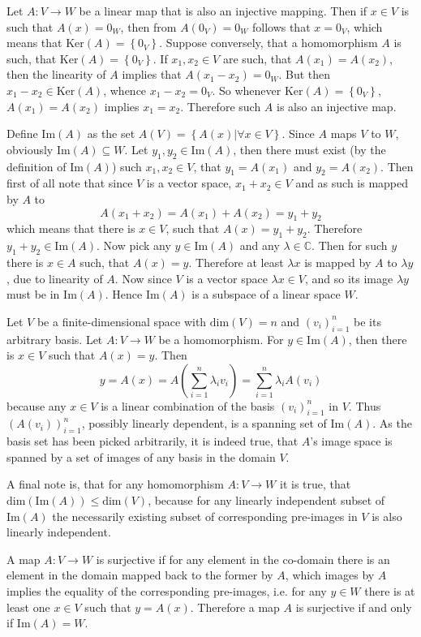 \documentclass[a4paper]{article}
\newcommand{\obj}[1]{\ensuremath{\left\{ #1 \right\}}}
\newcommand{\brac}[1]{\ensuremath{\left( #1 \right)}}
\newcommand{\Dim}[1]{\ensuremath{\text{dim}\brac{ #1 }}}
\newcommand{\Ker}[1]{\ensuremath{\text{Ker}\brac{ #1 }}}
\newcommand{\im}[1]{\ensuremath{\text{Im}\brac{ #1 }}}
\begin{document}
Let $A:V\to W$ be a linear map that is also an injective mapping. Then if $x\in V$ is such that $A\brac{x}=0_W$, then from $A\brac{0_V} = 0_W$ follows that $x = 0_V$, which means that $\Ker{A} = \obj{0_V}$. Suppose conversely, that a homomorphism $A$ is such, that $\Ker{A} = \obj{0_V}$. If $x_1, x_2\in V$ are such, that $A\brac{x_1} = A\brac{x_2}$, then the linearity of $A$ implies that $A\brac{x_1-x_2}=0_W$. But then $x_1-x_2 \in \Ker{A}$, whence $x_1-x_2=0_V$. So whenever $\Ker{A}=\obj{0_V}$, $A\brac{x_1} = A\brac{x_2}$ implies $x_1 = x_2$. Therefore such $A$ is also an injective map.

Define $\im{A}$ as the set $A\brac{V} = \obj{A\brac{x}\vert \forall{x\in V} }$. Since $A$ maps $V$ to $W$, obviously $\im{A} \subseteq W$. Let $y_1, y_2\in \im{A}$, then there must exist (by the definition of $\im{A}$) such $x_1, x_2\in V$, that $y_1 = A\brac{x_1}$ and $y_2 = A\brac{x_2}$. Then first of all note that since $V$ is a vector space, $x_1 + x_2\in V$ and as such is mapped by $A$ to \[A\brac{x_1+x_2} = A\brac{x_1} + A\brac{x_2} = y_1 + y_2\] which means that there is $x\in V$, such that $A\brac{x} = y_1+y_2$. Therefore $y_1+y_2\in \im{A}$. Now pick any $y\in \im{A}$ and any $\lambda\in \mathbb{C}$. Then for such $y$ there is $x\in A$ such, that $A\brac{x} = y$. Therefore at least $\lambda x$ is mapped by $A$ to $\lambda y$, due to linearity of $A$. Now since $V$ is a vector space $\lambda x \in V$, and so its image $\lambda y$ must be in $\im{A}$. Hence $\im{A}$ is a subspace of a linear space $W$.

Let $V$ be a finite-dimensional space with $\Dim{V} = n$ and $\brac{v_i}_{i=1}^n$ be its arbitrary basis. Let $A:V\to W$ be a homomorphism. For $y \in \im{A}$, then there is $x \in V$ such that $A\brac{x}=y$. Then\[y = A\brac{x} = A\brac{\sum_{i=1}^n \lambda_i v_i} = \sum_{i=1}^n \lambda_i A\brac{v_i}\] because any $x\in V$ is a linear combination of the basis $\brac{v_i}_{i=1}^n$ in $V$. Thus $\brac{A\brac{v_i}}_{i=1}^n$, possibly linearly dependent, is a spanning set of $\im{A}$. As the basis set has been picked arbitrarily, it is indeed true, that $A$'s image space is spanned by a set of images of any basis in the domain $V$.

A final note is, that for any homomorphism $A:V\to W$ it is true, that $\Dim{\im{A}}\leq \Dim{V}$, because for any linearly independent subset of $\im{A}$ the necessarily existing subset of corresponding pre-images in $V$ is also linearly independent.

A map $A:V\to W$ is surjective if for any element in the co-domain there is an element in the domain mapped back to the former by $A$, which images by $A$ implies the equality of the corresponding pre-images, i.e. for any $y\in W$ there is at least one $x\in V$ such that $y = A\brac{x}$. Therefore a map $A$ is surjective if and only if $\im{A} = W$.
\end{document}
